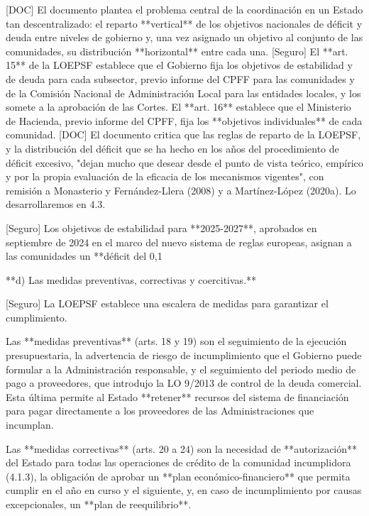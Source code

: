 \documentclass[10pt,a4paper]{article}
\begin{document}
[DOC] El documento plantea el problema central de la coordinación en un Estado tan descentralizado: el reparto **vertical** de los objetivos nacionales de déficit y deuda entre niveles de gobierno y, una vez asignado un objetivo al conjunto de las comunidades, su distribución **horizontal** entre cada una. [Seguro] El **art. 15** de la LOEPSF establece que el Gobierno fija los objetivos de estabilidad y de deuda para cada subsector, previo informe del CPFF para las comunidades y de la Comisión Nacional de Administración Local para las entidades locales, y los somete a la aprobación de las Cortes. El **art. 16** establece que el Ministerio de Hacienda, previo informe del CPFF, fija los **objetivos individuales** de cada comunidad. [DOC] El documento critica que las reglas de reparto de la LOEPSF, y la distribución del déficit que se ha hecho en los años del procedimiento de déficit excesivo, "dejan mucho que desear desde el punto de vista teórico, empírico y por la propia evaluación de la eficacia de los mecanismos vigentes", con remisión a Monasterio y Fernández-Llera (2008) y a Martínez-López (2020a). Lo desarrollaremos en 4.3.

[Seguro] Los objetivos de estabilidad para **2025-2027**, aprobados en septiembre de 2024 en el marco del nuevo sistema de reglas europeas, asignan a las comunidades un **déficit del 0,1%

**d) Las medidas preventivas, correctivas y coercitivas.**

[Seguro] La LOEPSF establece una escalera de medidas para garantizar el cumplimiento.

Las **medidas preventivas** (arts. 18 y 19) son el seguimiento de la ejecución presupuestaria, la advertencia de riesgo de incumplimiento que el Gobierno puede formular a la Administración responsable, y el seguimiento del periodo medio de pago a proveedores, que introdujo la LO 9/2013 de control de la deuda comercial. Esta última permite al Estado **retener** recursos del sistema de financiación para pagar directamente a los proveedores de las Administraciones que incumplan.

Las **medidas correctivas** (arts. 20 a 24) son la necesidad de **autorización** del Estado para todas las operaciones de crédito de la comunidad incumplidora (4.1.3), la obligación de aprobar un **plan económico-financiero** que permita cumplir en el año en curso y el siguiente, y, en caso de incumplimiento por causas excepcionales, un **plan de reequilibrio**.
\end{document}
